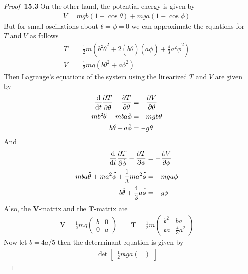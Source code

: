 \documentclass[11pt]{article}
\theoremstyle{definition}
\begin{document}
\begin{proof}{\textbf{15.3}}
    On the other hand, the potential energy is given by
    \begin{align*}
        V = mg b(1 - \cos\theta) + mga(1 - \cos\phi)
    \end{align*}
    But for small oscillations about $\theta = \phi = 0$ we can approximate
    the equations for $T$ and $V$ as follows
    \begin{align*}
        T &= \frac{1}{2}m\left(b^2\dot\theta^2
        + 2(b\dot\theta)(a\dot\phi)
        + \frac{4}{3}a^2\dot\phi^2\right)\\
        V &= \frac{1}{2}mg(b\theta^2 + a\phi^2)
    \end{align*}
    Then Lagrange's equations of the system using the linearized
    $T$ and $V$ are given by
    \begin{align*}
        \derivative{}{t}\partialderivative{T}{\dot\theta}
        - \partialderivative{T}{\theta} &= - \partialderivative{V}{\theta}\\
        mb^2 \ddot\theta + mba\ddot\phi &= - mgb\theta\\
        b \ddot\theta + a\ddot\phi &= - g\theta
    \end{align*}
    And
    \begin{align*}
        \derivative{}{t}\partialderivative{T}{\dot\phi}
        - \partialderivative{T}{\phi} &= - \partialderivative{V}{\phi}\\
        mba\ddot\theta + ma^2 \ddot\phi + \frac{1}{3} ma^2 \ddot\phi
        &= - mga\phi\\
        b \ddot\theta + \frac{4}{3}a\ddot\phi &= - g\phi
    \end{align*}
    Also, the $\bm{V}$-matrix and the $\bm{T}$-matrix are 
    \begin{align*}
        \bm{V} = \frac{1}{2}mg\begin{pmatrix}
            b  & 0\\
            0 & a
        \end{pmatrix}\quad\quad
        \bm{T} = \frac{1}{2}m\begin{pmatrix}
            b^2  & ba\\
            ba & \frac{4}{3}a^2
        \end{pmatrix}
    \end{align*}
    Now let $b = 4a/5$ then the determinant equation is given by
    \begin{align*}
        \det\begin{bmatrix}
            \frac{1}{2}mga \begin{pmatrix}

\end{pmatrix}
\end{bmatrix}
\end{align*}
\end{proof}
\end{document}
